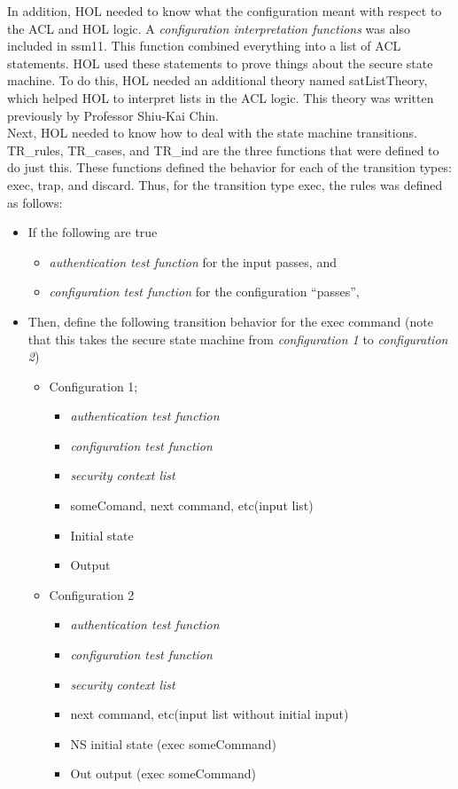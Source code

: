  In addition, HOL needed to know what the configuration meant with respect to the ACL and HOL logic. A
  \textit{configuration interpretation functions} was also included in ssm11. This function combined everything
  into a list of ACL statements. HOL used these statements to prove things about the secure state machine.
  To do this, HOL needed an additional theory named satListTheory, which helped HOL to interpret lists
  in the ACL logic. This theory was written previously by Professor Shiu-Kai Chin.\\

  Next, HOL needed to know how to deal with the state machine transitions. TR_rules, TR_cases, and TR_ind
  are the three functions that were defined to do just this. These functions defined the behavior for
  each of the transition types: exec, trap, and discard. Thus, for the transition type exec, the rules
  was defined as follows:
\begin{itemize}
\item If the following are true
  \begin{itemize}
  \item \textit{authentication test function} for the input passes, and
    \item \textit{configuration test function} for the configuration “passes”,
    \end{itemize}
  \item Then, define the following transition behavior for the exec command (note that this
    takes the secure state machine from \textit{configuration 1} to \textit{configuration 2})
    \begin{itemize}
    \item Configuration 1;
      \begin{itemize}
      \item \textit{authentication test function}
      \item \textit{configuration test function}
      \item \textit{security context list}
      \item \lbrack someComand, next command, etc\rbrack \;(input list)
      \item Initial state
        \item Output
        \end{itemize}
      \item Configuration 2
        \begin{itemize}
        \item \textit{authentication test function}
        \item \textit{configuration test function}
        \item \textit{security context list}
        \item \lbrack next command, etc\rbrack \;(input list without initial input)
        \item NS initial state (exec someCommand)
          \item Out output (exec someCommand)
        \end{itemize}
    \end{itemize}
  \end{itemize}
